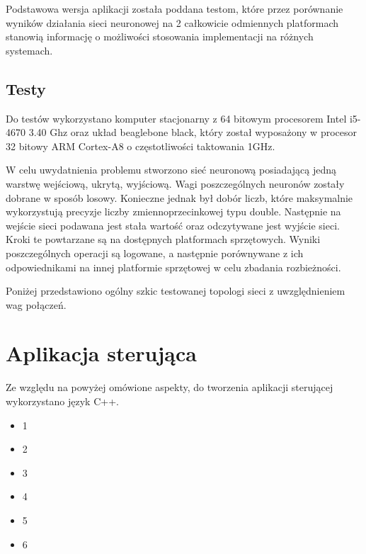 Podstawowa wersja aplikacji została poddana testom, które przez porównanie wyników działania sieci neuronowej na 2 całkowicie odmiennych platformach stanowią informację o możliwości stosowania implementacji na różnych systemach.
 
\subsection{Testy}
Do testów wykorzystano komputer stacjonarny z 64 bitowym procesorem Intel i5-4670 3.40 Ghz oraz układ beaglebone black, który został wyposażony w procesor 32 bitowy ARM Cortex-A8 o częstotliwości taktowania 1GHz.

W celu uwydatnienia problemu stworzono sieć neuronową posiadającą jedną  warstwę wejściową, ukrytą, wyjściową. Wagi poszczególnych neuronów zostały dobrane w sposób losowy. Konieczne jednak był dobór liczb, które maksymalnie wykorzystują precyzje liczby zmiennoprzecinkowej typu double. Następnie na wejście sieci podawana jest stała wartość oraz odczytywane jest wyjście sieci. Kroki te powtarzane są na  dostępnych platformach sprzętowych. Wyniki poszczególnych operacji są logowane, a następnie porównywane z ich odpowiednikami na innej platformie sprzętowej w celu zbadania rozbieżności.

Poniżej przedstawiono ogólny szkic testowanej topologi sieci z uwzględnieniem wag połączeń.

\section{Aplikacja sterująca}

Ze względu na powyżej omówione aspekty, do tworzenia aplikacji sterującej wykorzystano język C++. 

\begin{itemize}
	\item 1
	\item 2
	\item 3
	\item 4
	\item 5
	\item 6
\end{itemize}




